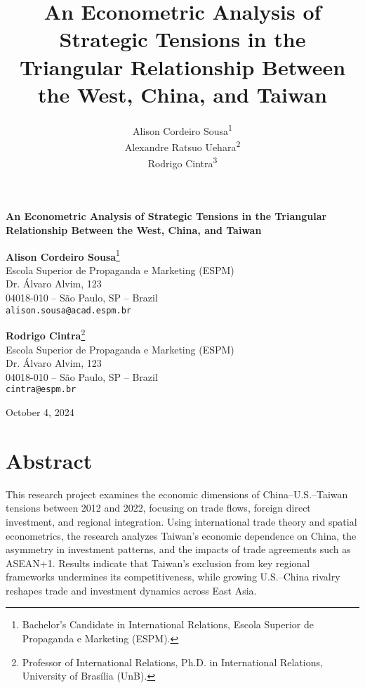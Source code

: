 \documentclass{article}
\title{An Econometric Analysis of Strategic Tensions in the Triangular Relationship Between the West, China, and Taiwan}
\author{
    Alison Cordeiro Sousa\textsuperscript{1} \\
    Alexandre Ratsuo Uehara\textsuperscript{2} \\
    Rodrigo Cintra\textsuperscript{3}
}
\date{}
\begin{document}
\fontsize{12pt}{18pt}\selectfont

\begin{center}
{\LARGE \textbf{An Econometric Analysis of Strategic Tensions in the Triangular Relationship Between the West, China, and Taiwan}}

\vspace{1.5cm}

\textbf{Alison Cordeiro Sousa}\footnote{Bachelor’s Candidate in International Relations, Escola Superior de Propaganda e Marketing (ESPM).}\\
Escola Superior de Propaganda e Marketing (ESPM)\\
Dr. Álvaro Alvim, 123\\
04018-010 – São Paulo, SP – Brazil\\
\texttt{alison.sousa@acad.espm.br}

\vspace{1cm}


\textbf{Rodrigo Cintra}\footnote{Professor of International Relations, Ph.D. in International Relations, University of Brasília (UnB).}\\
Escola Superior de Propaganda e Marketing (ESPM)\\
Dr. Álvaro Alvim, 123\\
04018-010 – São Paulo, SP – Brazil\\
\texttt{cintra@espm.br}

\vspace{1.5cm}

October 4, 2024
\end{center}

\thispagestyle{empty} %

\newpage

\section*{Abstract}
This research project examines the economic dimensions of China–U.S.–Taiwan tensions between 2012 and 2022, focusing on trade flows, foreign direct investment, and regional integration. Using international trade theory and spatial econometrics, the research analyzes Taiwan’s economic dependence on China, the asymmetry in investment patterns, and the impacts of trade agreements such as ASEAN+1. Results indicate that Taiwan’s exclusion from key regional frameworks undermines its competitiveness, while growing U.S.–China rivalry reshapes trade and investment dynamics across East Asia.
\end{document}
